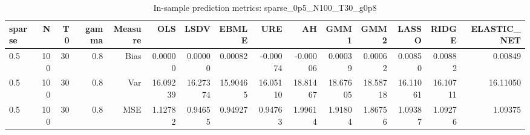 \begin{table}[!htbp]\centering
\caption{In-sample prediction metrics: sparse_0p5_N100_T30_g0p8}
\label{tab:table2_sparse_0p5_N100_T30_g0p8}
\begin{tabular}{lrrrrrrrrrrrrrr}
\hline
sparse & N & T0 & gamma & Measure & OLS & LSDV & EBMLE & URE & AH & GMM1 & GMM2 & LASSO & RIDGE & ELASTIC_NET \\
\hline
0.5 & 100 & 30 & 0.8 & Bias & 0.00000 & 0.00000 & 0.00082 & -0.00074 & -0.00006 & 0.00039 & 0.00062 & 0.00850 & 0.00882 & 0.00849 \\
0.5 & 100 & 30 & 0.8 & Var & 16.09239 & 16.27374 & 15.90465 & 16.05110 & 18.81467 & 18.67605 & 18.58718 & 16.11061 & 16.10711 & 16.11050 \\
0.5 & 100 & 30 & 0.8 & MSE & 1.12782 & 0.94655 & 0.94927 & 0.94763 & 1.99614 & 1.91804 & 1.86756 & 1.09387 & 1.09276 & 1.09375 \\
\hline
\end{tabular}
\end{table}

